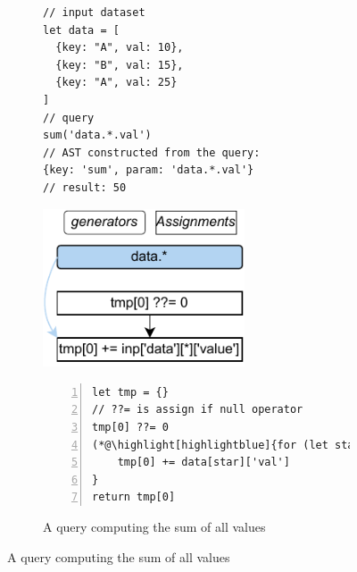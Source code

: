 \documentclass[runningheads]{llncs}
\begin{document}
\begin{figure}[t!]
\begin{subfigure}{\textwidth}
\begin{minipage}{0.3\textwidth}
\begin{lstlisting}[style=JavaScriptTiny, columns=flexible]
// input dataset
let data = [
  {key: "A", val: 10},
  {key: "B", val: 15},
  {key: "A", val: 25}
]
// query
sum('data.*.val')
// AST constructed from the query:
{key: 'sum', param: 'data.*.val'}
// result: 50
\end{lstlisting}
\end{minipage}
\begin{minipage}{0.3\textwidth}
\hspace{3.6mm}
\includegraphics[width=0.657\textwidth]{images/intro_q1_ir.pdf}
\end{minipage}
\begin{minipage}{0.38\textwidth}
\begin{lstlisting}[style=JavaScriptTiny, columns=flexible, numbers=left, xleftmargin=2pt]
let tmp = {}
// ??= is assign if null operator
tmp[0] ??= 0
(*@\highlight[highlightblue]{for (let star in data) }@*) {
    tmp[0] += data[star]['val']
}
return tmp[0]
\end{lstlisting}
\end{minipage}
\vspace{-4mm}
\caption{A query computing the sum of all values}\label{fig:intro_q1}
\end{subfigure}


\end{figure}
\end{document}
